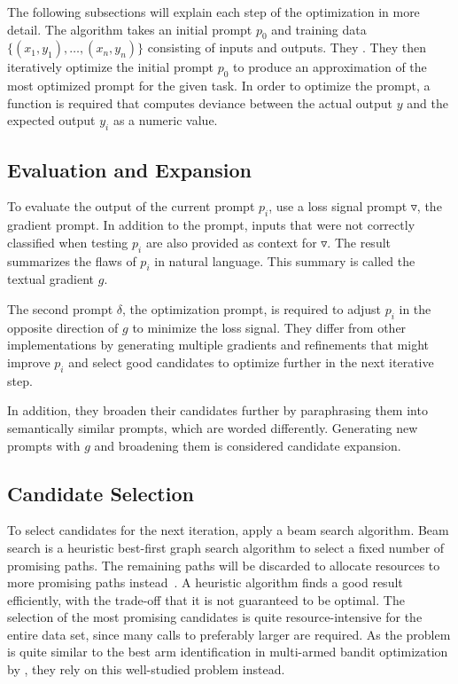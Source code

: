 The following subsections will explain each step of the \ProTeGi optimization in more detail. The \ProTeGi algorithm takes an initial prompt $p_0$ and training data $\{(x_1, y_1), \dots, (x_n, y_n)\}$ consisting of inputs and outputs. They . They then iteratively optimize the initial prompt $p_0$ to produce an approximation of the most optimized prompt for the given task. In order to optimize the prompt, a function is required that computes deviance between the actual output $y$ and the expected output $y_i$ as a numeric value.


\subsection{Evaluation and Expansion}
To evaluate the output of the current prompt $p_i$, \citeauthor{pryzant2023AutomaticPrompt} use a loss signal prompt $\triangledown$, the gradient prompt. In addition to the prompt, inputs that were not correctly classified when testing $p_i$ are also provided as context for $\triangledown$. The result summarizes the flaws of $p_i$ in natural language. This summary is called the textual gradient $g$.

The second prompt $\delta$, the optimization prompt, is required to adjust $p_i$ in the opposite direction of $g$ to minimize the loss signal. They differ from other implementations by generating multiple gradients and refinements that might improve $p_i$ and select good candidates to optimize further in the next iterative step.

In addition, they broaden their candidates further by paraphrasing them into semantically similar prompts, which are worded differently. Generating new prompts with $g$ and broadening them is considered candidate expansion.


\subsection{Candidate Selection}
To select candidates for the next iteration, \citeauthor{pryzant2023AutomaticPrompt} apply a beam search algorithm. Beam search is a heuristic best-first graph search algorithm to select a fixed number of promising paths. The remaining paths will be discarded to allocate resources to more promising paths instead~\cite{BeamSearch}. A heuristic algorithm finds a good result efficiently, with the trade-off that it is not guaranteed to be optimal. The selection of the most promising candidates is quite resource-intensive for the entire data set, since many calls to preferably larger \LLMs are required. As the problem is quite similar to the best arm identification in multi-armed bandit optimization by , they rely on this well-studied problem instead.

